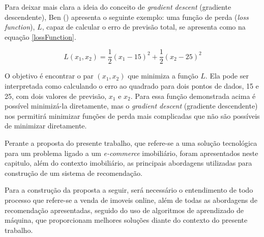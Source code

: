 Para deixar mais clara a ideia do conceito de \textit{gradient descent} (gradiente descendente), Ben (\citeyear{Ben:2017}) apresenta o seguinte exemplo: uma função de perda (\textit{loss function}), \(L\), capaz de calcular o erro de previsão total, se apresenta como na equação \eqref{lossFunction}.
 
 \begin{equation}\label{lossFunction}L(x_1, x_2)=\frac{1}{2}(x_1-15)^2+\frac{1}{2}(x_2-25)^2\end{equation}

O objetivo é encontrar o par \((x_1, x_2)\) que minimiza a função \(L\). Ela pode ser interpretada como calculando o erro ao quadrado para dois pontos de dados, 15 e 25, com dois valores de previsão, \(x_1\) e \(x_2\). Para essa função demonstrada acima é possível minimizá-la diretamente, mas o \textit{gradient descent} (gradiente descendente) nos permitirá minimizar funções de perda mais complicadas que não são possíveis de minimizar diretamente.

Perante a proposta do presente trabalho, que refere-se a uma solução tecnológica para um problema ligado a um \textit{e-commerce} imobiliário, foram apresentados neste capitulo, além do contexto imobiliário, as principais abordagens utilizadas para construção de um sistema de recomendação.

Para a construção da proposta a seguir, será necessário o entendimento de todo processo que refere-se a venda de imoveis online, além de todas as abordagens de recomendação apresentadas, seguido do uso de algoritmos de aprendizado de máquina, que proporcionam melhores soluções diante do contexto do presente trabalho.